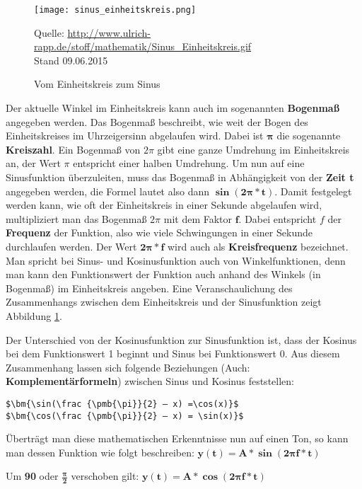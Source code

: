 \begin{figure} [ht]
\centering
\texttt{[image: sinus\_einheitskreis.png]}
\caption{Vom Einheitskreis zum Sinus}
\label{fig:unitcircleToSinus}
Quelle: \url{http://www.ulrich-rapp.de/stoff/mathematik/Sinus_Einheitskreis.gif}
\\Stand 09.06.2015
\end{figure}

Der aktuelle Winkel im Einheitskreis kann auch im sogenannten \textbf{Bogenmaß} angegeben werden. Das Bogenmaß beschreibt, wie weit der Bogen des Einheitskreises im Uhrzeigersinn abgelaufen wird. Dabei ist $\bm{\pmb{\pi}}$ die sogenannte \textbf{Kreiszahl}. Ein Bogenmaß von $2\pi$ gibt eine ganze Umdrehung im Einheitskreis an, der Wert $\pi$ entspricht einer halben Umdrehung. Um nun auf eine Sinusfunktion überzuleiten, muss das Bogenmaß in Abhängigkeit von der \textbf{Zeit t} angegeben werden, die Formel lautet also dann $\bm{\sin(2\pmb{\pi}*t)}$. Damit festgelegt werden kann, wie oft der Einheitskreis in einer Sekunde abgelaufen wird, multipliziert man das Bogenmaß $2\pi$ mit dem Faktor $\bm{f}$. Dabei entspricht $f$ der \textbf{Frequenz} der Funktion, also wie viele Schwingungen in einer Sekunde durchlaufen werden. Der Wert $\bm{2\pmb{\pi} * f}$ wird auch als \textbf{Kreisfrequenz} bezeichnet.
Man spricht bei Sinus- und Kosinusfunktion auch von Winkelfunktionen, denn man kann den Funktionswert der Funktion auch anhand des Winkels (in Bogenmaß) im Einheitskreis angeben. 
Eine Veranschaulichung des Zusammenhangs zwischen dem Einheitskreis und der Sinusfunktion zeigt Abbildung \ref{fig:unitcircleToSinus}.

Der Unterschied von der Kosinusfunktion zur Sinusfunktion ist, dass der Kosinus bei dem Funktionswert 1 beginnt und Sinus bei Funktionswert 0. Aus diesem Zusammenhang lassen sich folgende Beziehungen (Auch: \textbf{Komplementärformeln}) zwischen Sinus und Kosinus feststellen:\\

\begin{lstlisting}[mathescape]
$\bm{\sin(\frac {\pmb{\pi}}{2} – x) =\cos(x)}$
$\bm{\cos(\frac {\pmb{\pi}}{2} – x) = \sin(x)}$ 
\end{lstlisting}\cite[s. 218]{matheBuch}

Überträgt man diese mathematischen Erkenntnisse nun auf einen Ton, so kann man dessen Funktion wie folgt beschreiben: 		$\bm{y(t) = A * \sin(2 \pmb{\pi} f * t)}$

Um \textbf{90\degree} oder $\bm{\frac{\pmb{\pi}}{2}}$ verschoben gilt: 		$\bm{y(t) = A*\cos(2 \pmb{\pi} f*t)}$

